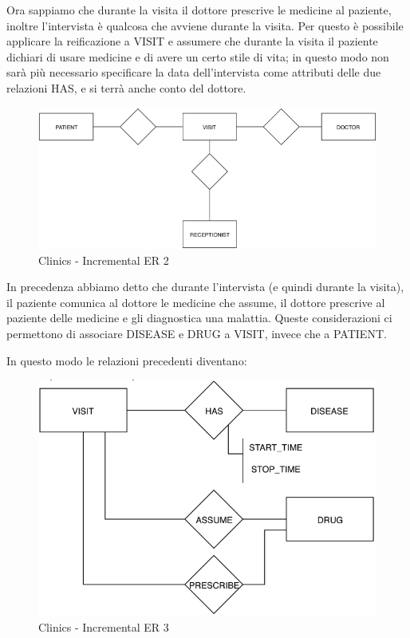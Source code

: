 Ora sappiamo che durante la visita il dottore prescrive le medicine al paziente, inoltre l’intervista è qualcosa che avviene durante la visita. Per questo è possibile applicare la reificazione a VISIT e assumere che durante la visita il paziente dichiari di usare medicine e di avere un certo stile di vita; in questo modo non sarà più necessario specificare la data dell’intervista come attributi delle due relazioni HAS, e si terrà anche conto del dottore.   

\begin{center}
\begin{figure}[H]
\centering
\includegraphics[scale=0.8]{figures/clinics_incER2.png}
\caption{Clinics - Incremental ER 2}
\end{figure}
\end{center}

In precedenza abbiamo detto che durante l'intervista (e quindi durante la visita), il paziente comunica al dottore le medicine che assume, il dottore prescrive al paziente delle medicine e gli diagnostica una malattia. Queste considerazioni ci permettono di associare DISEASE e DRUG a VISIT, invece che a PATIENT.	

In questo modo le relazioni precedenti diventano: 

\begin{center}
\begin{figure}[H]
\centering
\includegraphics[scale=0.8]{figures/clinics_incER3.png}
\caption{Clinics - Incremental ER 3}
\end{figure}
\end{center}

